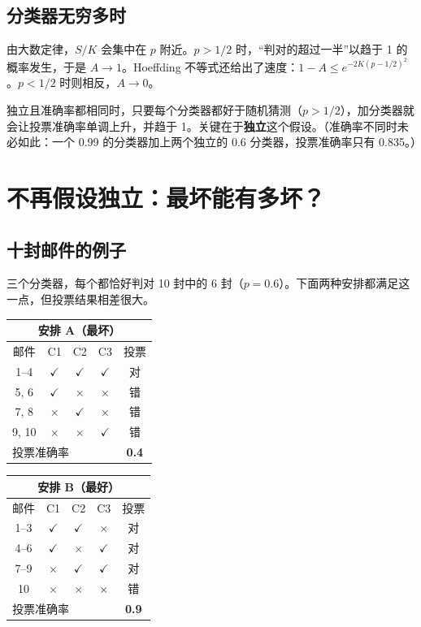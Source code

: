 \documentclass[11pt]{article}
\newcommand{\ok}{$\checkmark$}
\newcommand{\no}{\textcolor{warm}{$\times$}}
\begin{document}
\subsection{分类器无穷多时}
由大数定律，$S/K$ 会集中在 $p$ 附近。$p>1/2$ 时，“判对的超过一半”以趋于 1 的概率发生，于是 $A\to1$。Hoeffding 不等式还给出了速度：$1-A\le e^{-2K(p-1/2)^2}$。$p<1/2$ 时则相反，$A\to0$。

\begin{keybox}[title=要点]
独立且准确率都相同时，只要每个分类器都好于随机猜测（$p>1/2$），加分类器就会让投票准确率单调上升，并趋于 1。关键在于\textbf{独立}这个假设。（准确率不同时未必如此：一个 0.99 的分类器加上两个独立的 0.6 分类器，投票准确率只有 0.835。）
\end{keybox}

\section{不再假设独立：最坏能有多坏？}

\subsection{十封邮件的例子}
三个分类器，每个都恰好判对 10 封中的 6 封（$p=0.6$）。下面两种安排都满足这一点，但投票结果相差很大。

\begin{center}
\small
\begin{tabular}{c|ccc|c}
\multicolumn{5}{c}{\textbf{安排 A（最坏）}}\\
\toprule
邮件 & C1 & C2 & C3 & 投票\\
\midrule
1--4 & \ok & \ok & \ok & 对\\
5, 6 & \ok & \no & \no & 错\\
7, 8 & \no & \ok & \no & 错\\
9, 10 & \no & \no & \ok & 错\\
\midrule
\multicolumn{4}{l|}{投票准确率} & \textbf{0.4}\\
\bottomrule
\end{tabular}
\qquad
\begin{tabular}{c|ccc|c}
\multicolumn{5}{c}{\textbf{安排 B（最好）}}\\
\toprule
邮件 & C1 & C2 & C3 & 投票\\
\midrule
1--3 & \ok & \ok & \no & 对\\
4--6 & \ok & \no & \ok & 对\\
7--9 & \no & \ok & \ok & 对\\
10 & \no & \no & \no & 错\\
\midrule
\multicolumn{4}{l|}{投票准确率} & \textbf{0.9}\\
\bottomrule
\end{tabular}
\end{center}
\end{document}

